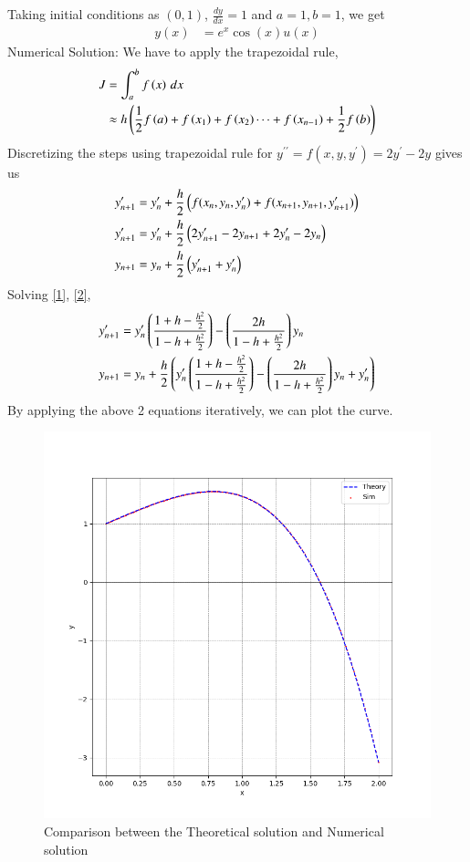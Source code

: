 \documentclass[journal]{IEEEtran}
\begin{document}
	Taking initial conditions as $(0,1)$, $\frac{dy}{dx} = 1$ and $a=1,b=1$, we get
		\begin{align}
					y(x) &= e^{x}\cos(x)u(x)
		\end{align}
	\newline
	Numerical Solution:\newline
	We have to apply the trapezoidal rule,
	\begin{align}
		J &= \int_a^b f\left(x\right)\, dx\\
		&\approx h\left(\frac{1}{2}f\left(a\right) + f\left(x_1\right) + f\left(x_2\right) \cdots + f\left(x_{n-1}\right) + \frac{1}{2}f\left(b\right)\right)\\
	\end{align}
	Discretizing the steps using trapezoidal rule for $y^{\prime\prime}  = f(x,y,y^\prime) = 2y^\prime - 2y$ gives us
	\begin{align}
		y^\prime_{n+1}  &= y^\prime_n + \frac{h}{2}\left(f(x_n,y_n,y_n^\prime) + f(x_{n+1},y_{n+1},y_{n+1}^\prime)\right) \\
		y^\prime_{n+1}  &= y^\prime_n + \frac{h}{2}\left( 2y^\prime_{n+1} - 2y_{n+1} + 2y^\prime_{n} - 2y_{n}\right) \label{1}\\
		y_{n+1}  &= y_n + \frac{h}{2}\left(y^\prime_{n+1} + y^\prime_n\right) \label{2}\\
	\end{align}
	Solving \eqref{1}, \eqref{2},
	\begin{align}
		y^\prime_{n+1}  &= y^\prime_n\left(\frac{1+ h - \frac{h^2}{2}}{1- h + \frac{h^2}{2}}\right) - \left(\frac{2h}{1- h + \frac{h^2}{2}}\right)y_n\\
		y_{n+1}  &= y_n + \frac{h}{2}\left(y^\prime_n\left(\frac{1+ h - \frac{h^2}{2}}{1- h + \frac{h^2}{2}}\right) - \left(\frac{2h}{1- h + \frac{h^2}{2}}\right)y_n + y^\prime_n\right) \label{2}\\
	\end{align}
	By applying the above 2 equations iteratively, we can plot the curve.
	\begin{figure}[h!]
		\centering
		\includegraphics[width=\columnwidth]{figs/fig1.png}
		\caption{Comparison between the Theoretical solution and Numerical solution}
		\label{stemplot}
	\end{figure}
	
\end{document}
